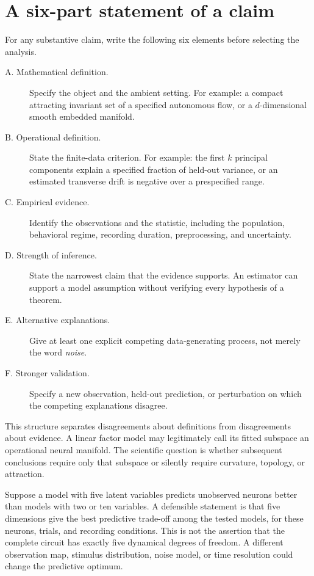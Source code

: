 \section{A six-part statement of a claim}\label{sec:12-framework}
For any substantive claim, write the following six elements before selecting the analysis.
\begin{description}
\item[A. Mathematical definition.] Specify the object and the ambient setting. For example: a compact attracting invariant set of a specified autonomous flow, or a \(d\)-dimensional smooth embedded manifold.
\item[B. Operational definition.] State the finite-data criterion. For example: the first \(k\) principal components explain a specified fraction of held-out variance, or an estimated transverse drift is negative over a prespecified range.
\item[C. Empirical evidence.] Identify the observations and the statistic, including the population, behavioral regime, recording duration, preprocessing, and uncertainty.
\item[D. Strength of inference.] State the narrowest claim that the evidence supports. An estimator can support a model assumption without verifying every hypothesis of a theorem.
\item[E. Alternative explanations.] Give at least one explicit competing data-generating process, not merely the word \emph{noise}.
\item[F. Stronger validation.] Specify a new observation, held-out prediction, or perturbation on which the competing explanations disagree.
\end{description}
This structure separates disagreements about definitions from disagreements about evidence. A linear factor model may legitimately call its fitted subspace an operational neural manifold. The scientific question is whether subsequent conclusions require only that subspace or silently require curvature, topology, or attraction.

\begin{example}
Suppose a model with five latent variables predicts unobserved neurons better than models with two or ten variables. A defensible statement is that five dimensions give the best predictive trade-off among the tested models, for these neurons, trials, and recording conditions. This is not the assertion that the complete circuit has exactly five dynamical degrees of freedom. A different observation map, stimulus distribution, noise model, or time resolution could change the predictive optimum.
\end{example}

